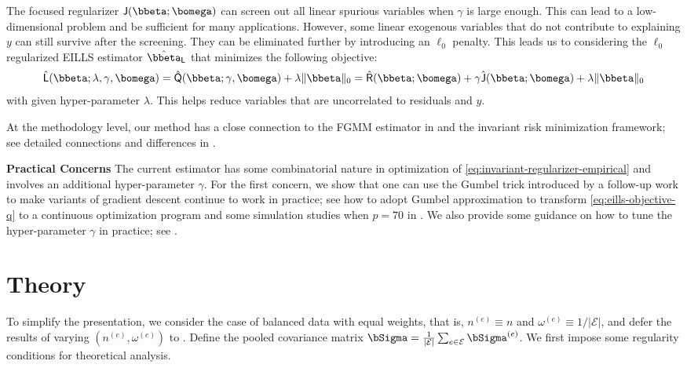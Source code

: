 \documentclass[10pt]{article}
\numberwithin{equation}{section}
\newcommand{\aosversion}[2]{\iftoggle{vaos}{#1}{#2}}
\newcommand{\blue}[1]{{\color{blue} #1}}
\begin{document}
{The focused regularizer $\mathsf{J}(\bbeta; \bomega)$ can screen out all linear spurious variables when $\gamma$ is large enough.  This can lead to a low-dimensional problem and be sufficient for many applications. However, some linear exogenous variables that do not contribute to explaining $y$ can still survive after the screening. They can be eliminated further by introducing an $\ell_0$ penalty.
This leads us to considering the $\ell_0$ regularized EILLS estimator $\hat{\bbeta}_{\mathsf{L}}$ that minimizes the following objective:
\begin{align}
\label{eq:eills-objective-l}
    \hat{\mathsf{L}}(\bbeta; \lambda, \gamma, \bomega) = \hat{\mathsf{Q}}(\bbeta; \gamma, \bomega) + \lambda \|\bbeta\|_0 =  \hat{\mathsf{R}}(\bbeta;\bomega) +  \gamma \hat{\mathsf{J}}(\bbeta;\bomega)  +  \lambda \|\bbeta\|_0
\end{align} with given hyper-parameter $\lambda$.  This helps reduce variables that are uncorrelated to residuals and $y$.

At the methodology level, our method has a close connection to the FGMM estimator in \cite{fan2014endogeneity} and the invariant risk minimization \citep{arjovsky2019invariant} framework; see detailed connections and differences in \aosversion{Appendix~{\color{blue}D}}{\cref{sec:discussion}}. 

\medskip

\noindent \textbf{Practical Concerns} The current estimator has some combinatorial nature in optimization of \eqref{eq:invariant-regularizer-empirical} and involves an additional hyper-parameter $\gamma$. For the first concern, we show that one can use the Gumbel \citep{jang2016categorical} trick introduced by a follow-up work \cite{gu2024causality} to make variants of gradient descent continue to work in practice; see how to adopt Gumbel approximation to transform \eqref{eq:eills-objective-q} to a continuous optimization program and some simulation studies when $p=70$ in \aosversion{Appendix \blue{D.6}}{\cref{sec:gumbel}}. We also provide some guidance on how to tune the hyper-parameter $\gamma$ in practice; see \aosversion{Appendix \blue{D.7}}{\cref{sec:gamma-tune}}.


\section{Theory}
\label{sec:theory}

 To simplify the presentation, we consider the case of balanced data with equal weights, that is, $n^{(e)} \equiv n$ and $\omega^{(e)} \equiv 1/|\mathcal{E}|$, and defer the results of varying $(n^{(e)}, \omega^{(e)})$ to \aosversion{Appendix~\blue{A}}{\cref{sec:theory:general}}. 
Define the pooled covariance matrix $\bSigma = \frac{1}{|\mathcal{E}|} \sum_{e\in \mathcal{E}} \bSigma^{(e)}$. We first impose some regularity conditions for theoretical analysis.

}
\end{document}
